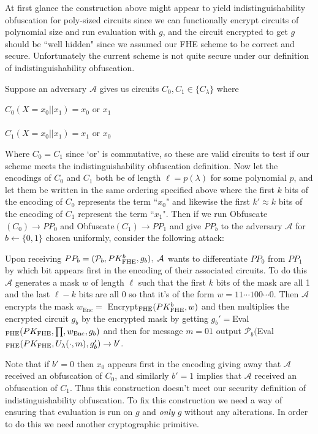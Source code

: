 \documentclass[12pt,twoside]{reedthesis}
\newcommand{\enc}[0]{\text{Enc}}
\begin{document}
    
    \par At first glance the construction above might appear to yield indistinguishability obfuscation for poly-sized circuits since we can functionally encrypt circuits of polynomial size and run evaluation with $g$, and the circuit encrypted to get $g$ should be ``well hidden" since we assumed our FHE scheme to be correct and secure. Unfortunately the current scheme is not quite secure under our definition of indistinguishability obfuscation. 
    \par Suppose an adversary $\mathcal{A}$ gives us circuits $C_0,C_1 \in \{ C_\lambda\}$ where 
   \begin{center}
    $C_0(X = x_0||x_1) = x_0 \text{ or } x_1$\\
     \\
   $C_1(X =x_0||x_1) = x_1 \text{ or } x_0$
    \end{center}
    Where $C_0 = C_1$ since `or' is commutative, so these are valid circuits to test if our scheme meets the indistinguishability obfuscation definition. Now let the encodings of $C_0$ and $C_1$ both be of length $\ell = p(\lambda)$ for some polynomial $p$, and let them be written in the same ordering specified above where the first $k$ bits of the encoding of $C_0$ represents the term ``$x_0$" and likewise the first $k' \approx k$ bits of the encoding of $C_1$ represent the term ``$x_1$". Then if we run Obfuscate$(C_0)\to PP_0$ and Obfuscate$(C_1) \to PP_1$ and give $PP_b$ to the adversary $\mathcal{A}$ for $b \leftarrow \{0,1\}$ chosen uniformly, consider the following attack:
    \par Upon receiving $PP_b =(\mathcal{P}_b,PK_\text{FHE}^b,g_b),\; \mathcal{A}$ wants to differentiate $PP_0$ from $PP_1$ by which bit appears first in the encoding of their associated circuits. To do this $\mathcal{A}$ generates a mask $w$ of length $\ell$ such that the first $k$ bits of the mask are all 1 and the last $\ell - k$ bits are all 0 so that it's of the form $w = 11\cdots 100 \cdots 0$. Then $\mathcal{A}$ encrypts the mask $w_\enc =$ Encrypt$_\text{FHE}(PK_\text{FHE}^b, w)$ and then multiplies the encrypted circuit $g_b$ by the encrypted mask by getting $g_b' =$Eval$\fhe(PK\fhe,\prod,w_\enc,g_b)$ and then for message $m=01$ output $\mathcal{P}_b($Eval$_\text{FHE}(PK_\text{FHE},U_\lambda(\cdot,m),g_b')\to b'$. 
    \par Note that if $b' = 0$ then $x_0$ appears first in the encoding giving away that $\mathcal{A}$ received an obfuscation of $C_0$, and similarly $b'=1$ implies that $\mathcal{A}$ received an obfuscation of $C_1$. Thus this construction doesn't meet our security definition of indistinguishability obfuscation. To fix this construction we need a way of ensuring that evaluation is run on $g$ and \textit{only} $g$ without any alterations. In order to do this we need another cryptographic primitive.
       
\end{document}
